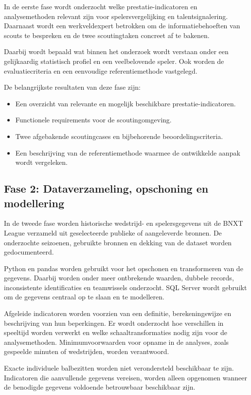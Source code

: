 In de eerste fase wordt onderzocht welke prestatie-indicatoren en analysemethoden relevant zijn voor spelersvergelijking en talentsignalering. Daarnaast wordt een werkveldexpert betrokken om de informatiebehoeften van scouts te bespreken en de twee scoutingtaken concreet af te bakenen.

Daarbij wordt bepaald wat binnen het onderzoek wordt verstaan onder een gelijkaardig statistisch profiel en een veelbelovende speler. Ook worden de evaluatiecriteria en een eenvoudige referentiemethode vastgelegd.

De belangrijkste resultaten van deze fase zijn:
\begin{itemize}
  \item Een overzicht van relevante en mogelijk beschikbare prestatie-indicatoren.
  \item Functionele requirements voor de scoutingomgeving.
  \item Twee afgebakende scoutingcases en bijbehorende beoordelingscriteria.
  \item Een beschrijving van de referentiemethode waarmee de ontwikkelde aanpak wordt vergeleken.
\end{itemize}

\subsection{Fase 2: Dataverzameling, opschoning en modellering}

In de tweede fase worden historische wedstrijd- en spelersgegevens uit de BNXT League verzameld uit geselecteerde publieke of aangeleverde bronnen. De onderzochte seizoenen, gebruikte bronnen en dekking van de dataset worden gedocumenteerd.

Python en pandas worden gebruikt voor het opschonen en transformeren van de gegevens. Daarbij worden onder meer ontbrekende waarden, dubbele records, inconsistente identificaties en teamwissels onderzocht. SQL Server wordt gebruikt om de gegevens centraal op te slaan en te modelleren.

Afgeleide indicatoren worden voorzien van een definitie, berekeningswijze en beschrijving van hun beperkingen. Er wordt onderzocht hoe verschillen in speeltijd worden verwerkt en welke schaaltransformaties nodig zijn voor de analysemethoden. Minimumvoorwaarden voor opname in de analyses, zoals gespeelde minuten of wedstrijden, worden verantwoord.

Exacte individuele balbezitten worden niet verondersteld beschikbaar te zijn. Indicatoren die aanvullende gegevens vereisen, worden alleen opgenomen wanneer de benodigde gegevens voldoende betrouwbaar beschikbaar zijn.


